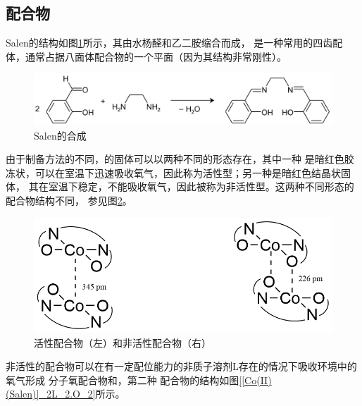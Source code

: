 \documentclass[a4paper,zihao=5,UTF8]{ctexart}
\begin{document}
    \subsection{配合物}
    \par Salen的结构如图\ref{Salen}所示，其由水杨醛和乙二胺缩合而成，
    是一种常用的四齿配体，通常占据八面体配合物的一个平面（因为其结构非常刚性）。
    \begin{figure}[htbp]
        \centering
        \includegraphics[scale=0.15]{Preparation_of_salen.png}
        \caption{Salen的合成}
        \label{Salen}
    \end{figure}
    \par 
    由于制备方法的不同，的固体可以以两种不同的形态存在，其中一种
    是暗红色胶冻状，可以在室温下迅速吸收氧气，因此称为活性型；另一种是暗红色结晶状固体，
    其在室温下稳定，不能吸收氧气，因此被称为非活性型。这两种不同形态的配合物结构不同，
    参见图\ref{CoSalen}。
    \begin{figure}
        \centering  
        \includegraphics[scale=0.4]{CoSalen.png}
        \caption{活性配合物（左）和非活性配合物（右）}
        \label{CoSalen}
    \end{figure}
    \par 
    非活性的配合物可以在有一定配位能力的非质子溶剂L存在的情况下吸收环境中的氧气形成
    分子氧配合物和，第二种
    配合物的结构如图\ref{[Co(II)(Salen)]_2L_2.O_2}所示。
\end{document}

